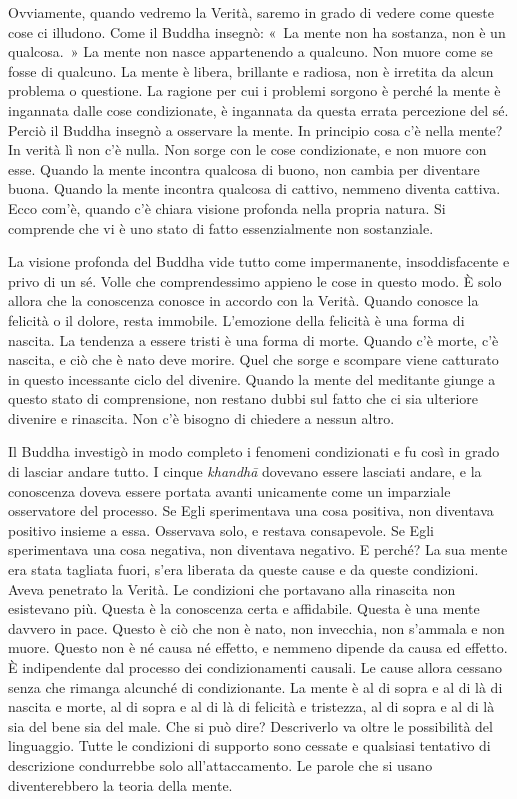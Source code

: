 Ovviamente, quando vedremo la Verità, saremo in grado di vedere come
queste cose ci illudono. Come il Buddha insegnò: «~La mente non ha
sostanza, non è un qualcosa.~» La mente non nasce appartenendo a
qualcuno. Non muore come se fosse di qualcuno. La mente è libera,
brillante e radiosa, non è irretita da alcun problema o questione. La
ragione per cui i problemi sorgono è perché la mente è ingannata dalle
cose condizionate, è ingannata da questa errata percezione del sé.
Perciò il Buddha insegnò a osservare la mente. In principio cosa c'è
nella mente? In verità lì non c'è nulla. Non sorge con le cose
condizionate, e non muore con esse. Quando la mente incontra qualcosa di
buono, non cambia per diventare buona. Quando la mente incontra qualcosa
di cattivo, nemmeno diventa cattiva. Ecco com'è, quando c'è chiara
visione profonda nella propria natura. Si comprende che vi è uno stato
di fatto essenzialmente non sostanziale.

La visione profonda del Buddha vide tutto come impermanente,
insoddisfacente e privo di un sé. Volle che comprendessimo appieno le
cose in questo modo. È solo allora che la conoscenza conosce in accordo
con la Verità. Quando conosce la felicità o il dolore, resta immobile.
L'emozione della felicità è una forma di nascita. La tendenza a essere
tristi è una forma di morte. Quando c'è morte, c'è nascita, e ciò che è
nato deve morire. Quel che sorge e scompare viene catturato in questo
incessante ciclo del divenire. Quando la mente del meditante giunge a
questo stato di comprensione, non restano dubbi sul fatto che ci sia
ulteriore divenire e rinascita. Non c'è bisogno di chiedere a nessun
altro.

Il Buddha investigò in modo completo i fenomeni condizionati e fu così
in grado di lasciar andare tutto. I cinque \emph{khandhā} dovevano
essere lasciati andare, e la conoscenza doveva essere portata avanti
unicamente come un imparziale osservatore del processo. Se Egli
sperimentava una cosa positiva, non diventava positivo insieme a essa.
Osservava solo, e restava consapevole. Se Egli sperimentava una cosa
negativa, non diventava negativo. E perché? La sua mente era stata
tagliata fuori, s'era liberata da queste cause e da queste condizioni.
Aveva penetrato la Verità. Le condizioni che portavano alla rinascita
non esistevano più. Questa è la conoscenza certa e affidabile. Questa è
una mente davvero in pace. Questo è ciò che non è nato, non invecchia,
non s'ammala e non muore. Questo non è né causa né effetto, e nemmeno
dipende da causa ed effetto. È indipendente dal processo dei
condizionamenti causali. Le cause allora cessano senza che rimanga
alcunché di condizionante. La mente è al di sopra e al di là di nascita
e morte, al di sopra e al di là di felicità e tristezza, al di sopra e
al di là sia del bene sia del male. Che si può dire? Descriverlo va
oltre le possibilità del linguaggio. Tutte le condizioni di supporto
sono cessate e qualsiasi tentativo di descrizione condurrebbe solo
all'attaccamento. Le parole che si usano diventerebbero la teoria della
mente.

